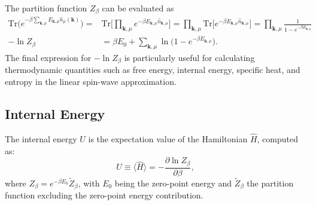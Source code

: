 \documentclass[aps, prx, nofootinbib, superscriptaddress]{revtex4-2}
\newcommand{\kvec}{\mathbf{k}}
\newcommand{\Tr}{\mathrm{Tr}}
\begin{document}
The partition function $Z_{\beta}$ can be evaluated as
\begin{subequations}\label{eq: explicit expressions for Z and log-Z}
    \begin{align}
        \Tr \big( e^{- \beta \sum_{\kvec, \mu} E_{\kvec, \mu} \hat{n}_{\mu}(\kvec)} \big) 
        = & \Tr \Big[ \prod_{\kvec, \mu} e^{- \beta E_{\kvec, \mu} \hat{n}_{\kvec, \mu}} \Big]
        = \prod_{\kvec, \mu} \Tr \Big[ e^{- \beta E_{\kvec, \mu} \hat{n}_{\kvec, \mu}} \Big] 
        =  \prod_{\kvec, \mu}  \frac{1}{1 - e^{- \beta E_{\kvec, \mu}}} \\
        - \ln Z_{\beta} &= \beta E_{0} + \sum_{\kvec, \mu} \ln \big( 1 - e^{- \beta E_{\kvec, \mu}} \big).
    \end{align}
\end{subequations}
The final expression for $-\ln Z_{\beta}$ is particularly useful for calculating thermodynamic quantities such as free energy, internal energy, specific heat, and entropy in the linear spin-wave approximation.

\subsection{Internal Energy}\label{subsec: Internal Energy}
The internal energy $U$ is the expectation value of the Hamiltonian $\hat{H}$, computed as:
\begin{equation}
    U \equiv \langle \hat{H} \rangle  = -\frac{\partial \ln Z_{\beta}}{\partial \beta},
\end{equation}
where $Z_{\beta} = e^{- \beta E_{0}} \tilde{Z}_{\beta}$, with $E_0$ being the zero-point energy and $\tilde{Z}_{\beta}$ the partition function excluding the zero-point energy contribution.
\end{document}
